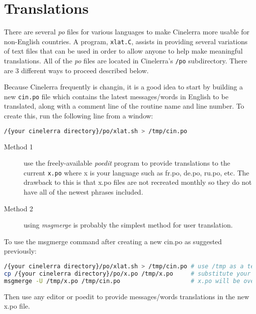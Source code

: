 \chapter{Translations}%
\label{cha:translations}

There are several \textit{po} files for various languages to make Cinelerra more usable for non-English countries.  A program, \texttt{xlat.C}, assists in providing several variations of text files that can be used in order to allow anyone to help make meaningful translations.  All of the \textit{po} files are located in Cinelerra’s \texttt{/po} subdirectory. There are 3 different ways to proceed described below.

Because Cinelerra frequently is changin, it is a good idea to start by building a new \texttt{cin.po} file which contains the latest messages/words in English to be translated, along with a comment line of the routine name and line number.  To create this, run the following line from a window:

\begin{lstlisting}[language=bash,numbers=none]
/{your cinelerra directory}/po/xlat.sh > /tmp/cin.po
\end{lstlisting}

\begin{description}
	\item[Method 1]  use the freely-available \textit{poedit} program to provide translations to the current \texttt{x.po} where x is your language such as fr.po, de.po, ru.po, etc.  The drawback to this is that x.po files are not recreated monthly so they do not have all of the newest phrases included.
	\item[Method 2] using \textit{msgmerge} is probably the simplest method for user translation.
\end{description}

To use the msgmerge command after creating a new cin.po as suggested previously:

\begin{lstlisting}[language=bash,numbers=none]
/{your cinelerra directory}/po/xlat.sh > /tmp/cin.po # use /tmp as a temporary place
cp /{your cinelerra directory}/po/x.po /tmp/x.po     # substitute your language for x
msgmerge -U /tmp/x.po /tmp/cin.po                    # x.po will be overwritten to include updates
\end{lstlisting}

Then use any editor or poedit to provide messages/words translations in the new x.po file.

